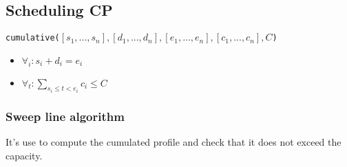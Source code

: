 

\subsection{Scheduling CP}

\begin{center}
    \texttt{cumulative($[s_1,..., s_n], [d_1, ..., d_n], [e_1, ...,
    e_n], [c_1, ..., c_n], C$)}
\end{center}

\begin{itemize}
    \item $\forall_i: s_i + d_i = e_i$
    \item $\forall_t: \sum_{s_i \leq t < e_i} c_i \leq C$
\end{itemize}

\subsubsection{Sweep line algorithm}
It's use to compute the cumulated
profile and check that it does not exceed the capacity.



